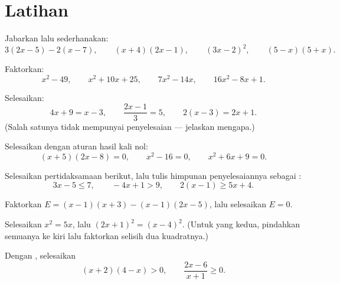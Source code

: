 \section{Latihan}

\begin{exercise}[$\star$]\label{exo:g10:algebra:1}
Jabarkan lalu sederhanakan:
\[
3(2x - 5) - 2(x - 7), \qquad
(x + 4)(2x - 1), \qquad
(3x - 2)^2, \qquad
(5 - x)(5 + x).
\]
\end{exercise}

\begin{exercise}[$\star$]\label{exo:g10:algebra:2}
Faktorkan:
\[
x^2 - 49, \qquad
x^2 + 10x + 25, \qquad
7x^2 - 14x, \qquad
16x^2 - 8x + 1 .
\]
\end{exercise}

\begin{exercise}[$\star$]\label{exo:g10:algebra:3}
Selesaikan:
\[
4x + 9 = x - 3, \qquad
\frac{2x - 1}{3} = 5, \qquad
2(x - 3) = 2x + 1 .
\]
(Salah satunya tidak mempunyai penyelesaian --- jelaskan mengapa.)
\end{exercise}

\begin{exercise}[$\star$]\label{exo:g10:algebra:4}
Selesaikan dengan aturan hasil kali nol:
\[
(x + 5)(2x - 8) = 0, \qquad
x^2 - 16 = 0, \qquad
x^2 + 6x + 9 = 0 .
\]
\end{exercise}

\begin{exercise}[$\star$]\label{exo:g10:algebra:5}
Selesaikan pertidaksamaan berikut, lalu tulis himpunan penyelesaiannya sebagai :
\[
3x - 5 \leq 7, \qquad
-4x + 1 > 9, \qquad
2(x - 1) \geq 5x + 4 .
\]
\end{exercise}

\begin{exercise}[$\star\star$]\label{exo:g10:algebra:6}
Faktorkan $E = (x - 1)(x + 3) - (x - 1)(2x - 5)$, lalu selesaikan $E = 0$.
\end{exercise}

\begin{exercise}[$\star\star$]\label{exo:g10:algebra:7}
Selesaikan $x^2 = 5x$, lalu $(2x + 1)^2 = (x - 4)^2$. (Untuk yang kedua,
pindahkan semuanya ke kiri lalu faktorkan selisih dua kuadratnya.)
\end{exercise}

\begin{exercise}[$\star\star$]\label{exo:g10:algebra:8}
Dengan , selesaikan
\[
(x + 2)(4 - x) > 0,
\qquad
\frac{2x - 6}{x + 1} \geq 0 .
\]
\end{exercise}

